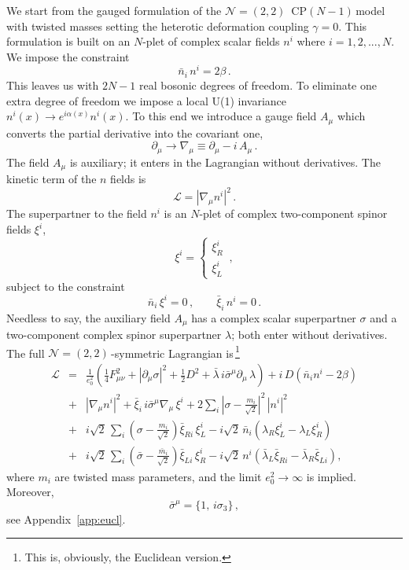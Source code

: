 \documentclass[epsfig,12pt]{article}
\def\beq{\begin{equation}}
\def\eeq{\end{equation}}
\def\beqn{\begin{eqnarray}}
\def\eeqn{\end{eqnarray}}
\newcommand{\ntt}{${\mathcal N}=(2,2)\,$}
\newcommand{\cpn}{CP$(N-1)\,$}
\newcommand{\cell}{{\mathcal L}}
\newcommand{\pt}{\partial}
\def\beqn{\begin{eqnarray}}
\def\eeqn{\end{eqnarray}}
\def\beq{\begin{equation}}
\def\eeq{\end{equation}}
\begin{document}
We start from the gauged formulation \cite{W79,W93} of
the \mbox{\ntt} \cpn model with twisted masses
\cite{twisted} setting the heterotic deformation coupling
$\gamma = 0$.
This formulation is built on an $N$-plet of complex scalar fields $n^i$ where $i=1,2,...,N$.
We impose the constraint
\beq
\bar n_i \,n^i = 2\beta \,.
\label{m31}
\eeq
This leaves us with $2N-1$ real bosonic degrees of freedom. To eliminate one extra degree
of freedom we impose a local U(1) invariance $n^i(x)\to e^{i\alpha(x)} n^i(x)$.
To this end we introduce a gauge field $A_\mu$ which converts the partial derivative into the
covariant one,
\beq
\partial_\mu\to \nabla_\mu \equiv \partial_\mu -i\,  A_\mu\,.
\label{m32}
\eeq
The field $A_\mu$ is auxiliary; it enters in the Lagrangian without derivatives. The kinetic term of the
$n$ fields is
\beq
\cell  = \left|\nabla_\mu n^i\right|^2\,.
\label{m33}
\eeq
The superpartner to the field $n^i$ is an $N$-plet of complex two-component spinor fields $\xi^i$,
\beq
\xi^i =\left\{\begin{array}{l}
\xi^i_R\\[2mm]
\xi^i_L
\end{array}
\right.\,,
\label{m34}
\eeq
subject to the constraint
\beq
\bar{n}_i\,\xi^i =0\,,\qquad \bar\xi_i\,n^i = 0\,.
\label{npxi}
\eeq
Needless to say, the auxiliary field $A_\mu$ has a complex scalar superpartner $\sigma$ 
and a two-component complex spinor superpartner $\lambda$; both enter without derivatives.
The full \ntt-symmetric Lagrangian is\,\footnote{This is, obviously, the Euclidean version.}
\beqn
\cell &=& 
\frac{1}{e_0^2}\left(\frac{1}{4} F_{\mu\nu}^2 +\left|\pt_\mu\sigma\right|^2 + \frac{1}{2}D^2
+\bar\lambda \, i\bar{\sigma}^\mu\pt_\mu\,\lambda
\right) + i\,D\left(\bar{n}_i n^i -2\beta
\right)
\nonumber\\[3mm]
&+&
\left|\nabla_\mu n^i\right|^2+ \bar{\xi}_i\, i\bar{\sigma}^\mu\nabla_\mu\,\xi^i
+ 2\sum_i\left|\sigma-\frac{m_i}{\sqrt 2}\right|^2\, |n^i|^2
\nonumber\\[3mm]
&+&
i\sqrt{2}\,\sum_i \left( \sigma -\frac{m_i}{\sqrt 2}\right)\bar\xi_{Ri}\, \xi^i_L 
- i\sqrt{2}\,\bar{n}_i \left(\lambda_R\xi^i_L - \lambda_L\xi^i_R \right)
\nonumber\\
&+&
i\sqrt{2}\,\sum_i \left( \bar\sigma -\frac{\bar{m}_i}{\sqrt 2}\right)\bar\xi_{Li}\, \xi^i_R 
- i\sqrt{2}\,{n}^i \left(\bar\lambda_L\bar\xi_{Ri} - \bar\lambda_R\bar\xi_{Li} \right),
\label{bee31}
\eeqn
where $m_i$ are twisted mass parameters, and the limit $e_0^2\to\infty$ is implied. 
Moreover,
\beq
\bar\sigma^\mu = \{1,\,i\sigma_3\}\,,
\label{wtpi3}
\eeq
see Appendix~\ref{app:eucl}.
\end{document}
